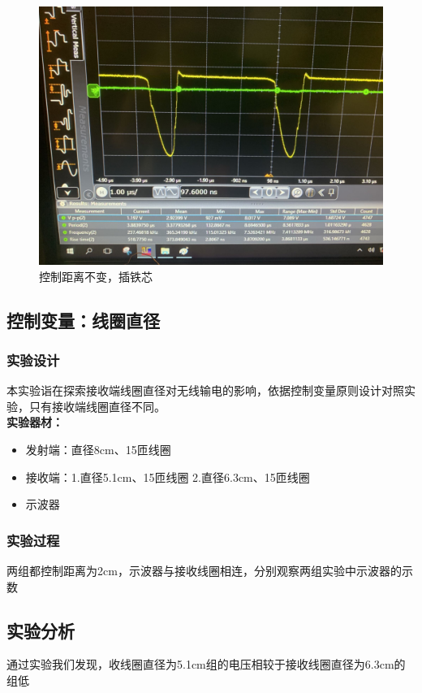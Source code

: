 \documentclass[conference]{IEEEtran}
\theoremstyle{break}
\begin{document}
\begin{figure}[htbp]
        \centerline{\includegraphics[scale=0.1]{频率3.png}}
        \caption{控制距离不变，插铁芯}
        \label{fig}
        \end{figure}             
        
\subsection{控制变量：线圈直径}
\subsubsection{实验设计}
本实验诣在探索接收端线圈直径对无线输电的影响，依据控制变量原则设计对照实验，只有接收端线圈直径不同。\\
\textbf{实验器材：}
\begin{itemize}
\item 发射端：直径8cm、15匝线圈
\item 接收端：1.直径5.1cm、15匝线圈  2.直径6.3cm、15匝线圈
\item 示波器
\end{itemize}
\subsubsection{实验过程}
两组都控制距离为2cm，示波器与接收线圈相连，分别观察两组实验中示波器的示数
\subsection{实验分析}
通过实验我们发现，收线圈直径为5.1cm组的电压相较于接收线圈直径为6.3cm的组低
\end{document}
